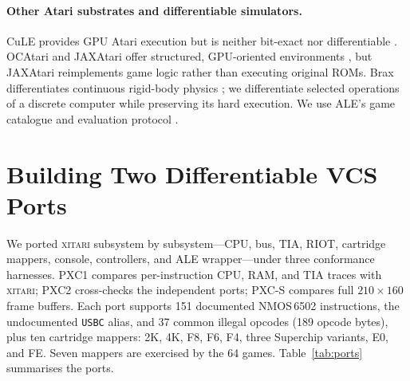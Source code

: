 \documentclass[letterpaper]{article} %
\begin{document}
\paragraph{Other Atari substrates and differentiable simulators.}
CuLE provides GPU Atari execution but is neither bit-exact nor
differentiable \citep{dalton2020cule}. OCAtari and JAXAtari offer
structured, GPU-oriented environments
\citep{delfosse2023ocatari,delfosse2025jaxatari}, but JAXAtari
reimplements game logic rather than executing original ROMs.
Brax differentiates continuous rigid-body physics
\citep{freeman2021brax}; we differentiate selected operations
of a discrete computer while preserving its hard execution.
We use ALE's game catalogue and evaluation protocol
\citep{bellemare2013arcade,machado2018revisiting}.

\section{Building Two Differentiable VCS Ports}

We ported \textsc{xitari} subsystem by subsystem---CPU, bus, TIA,
RIOT, cartridge mappers, console, controllers, and ALE wrapper---under
three conformance harnesses. PXC1 compares per-instruction CPU, RAM,
and TIA traces with \textsc{xitari}; PXC2 cross-checks the independent
ports; PXC-S compares full $210\times160$ frame buffers.
Each port supports 151 documented NMOS\,6502 instructions,
the undocumented \texttt{USBC} alias, and 37 common illegal opcodes
(189 opcode bytes), plus ten cartridge mappers: 2K, 4K, F8, F6,
F4, three Superchip variants, E0, and FE. Seven mappers are
exercised by the 64 games. Table~\ref{tab:ports} summarises the ports.
\end{document}
